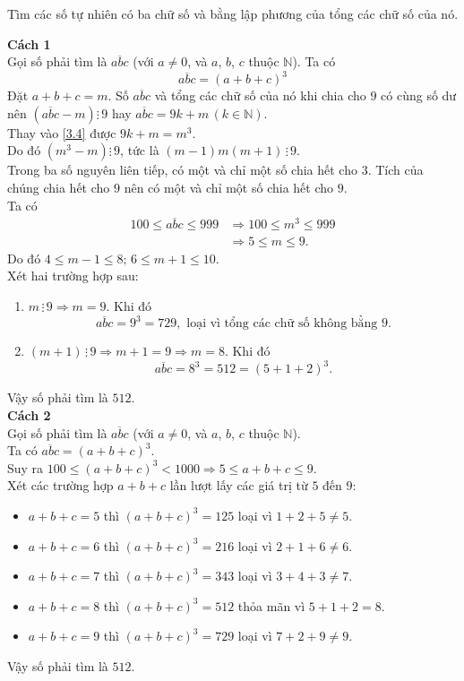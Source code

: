 \begin{bt}
 Tìm các số tự nhiên có ba chữ số và bằng lập phương của tổng các chữ số của nó.
 \loigiai
  {
  \textbf{Cách 1}\\
  Gọi số phải tìm là $\overline{abc}$ (với $a \neq 0$, và $a$, $b$, $c$ thuộc $\mathbb{N}$). Ta có
  \begin{equation}
   \overline{abc} = (a + b + c)^3 \label{3.4}
  \end{equation}
  Đặt $a + b + c = m$. Số $\overline{abc}$ và tổng các chữ số của nó khi chia cho $9$ có cùng số dư nên $\left( \overline{abc} - m \right) \vdots \, 9$ hay $\overline{abc} = 9k + m \, (k \in \mathbb{N})$.\\
  Thay vào \eqref{3.4} được $9k + m = m^3$.\\
  Do đó $\left( m^3 - m \right) \vdots \, 9$, tức là $(m - 1)m(m + 1) \, \vdots \, 9$.\\
  Trong ba số nguyên liên tiếp, có một và chỉ một số chia hết cho $3$. Tích của chúng chia hết cho $9$ nên có một và chỉ một số chia hết cho $9$.\\
  Ta có
  \begin{align*}
   100 \leq \overline{abc} \leq 999 & \Rightarrow 100 \leq m^3 \leq 999 \\
   & \Rightarrow 5 \leq m \leq 9.
  \end{align*}
  Do đó $4 \leq m - 1 \leq 8; \, 6 \leq m + 1 \leq 10$.\\
  Xét hai trường hợp sau:
  \begin{enumerate}
   \item $m \, \vdots \, 9 \Rightarrow m = 9$. Khi đó
   $$\overline{abc} = 9^3 = 729,  \textrm{ loại vì tổng các chữ số không bằng } 9.$$
   \item $(m + 1) \, \vdots \, 9 \Rightarrow m + 1 = 9 \Rightarrow m = 8$. Khi đó
   $$\overline{abc} = 8^3 = 512 = (5 + 1 + 2)^3.$$
  \end{enumerate}
  Vậy số phải tìm là $512$.\\
  \textbf{Cách 2}\\
  Gọi số phải tìm là $\overline{abc}$ (với $a \neq 0$, và $a$, $b$, $c$ thuộc $\mathbb{N}$).\\
  Ta có $\overline{abc} = (a + b + c)^3$.\\
  Suy ra $100 \leq (a + b + c)^3 < 1000 \Rightarrow 5 \leq a + b + c \leq 9$.\\
  Xét các trường hợp $a + b + c$ lần lượt lấy các giá trị từ $5$ đến $9$:
  \begin{itemize}
   \item $a + b + c = 5$ thì $(a + b + c)^3 = 125$ loại vì $1 + 2 + 5 \neq 5$.
   \item $a + b + c = 6$ thì $(a + b + c)^3 = 216$ loại vì $2 + 1 + 6 \neq 6$.
   \item $a + b + c = 7$ thì $(a + b + c)^3 = 343$ loại vì $3 + 4 + 3 \neq 7$.
   \item $a + b + c = 8$ thì $(a + b + c)^3 = 512$ thỏa mãn vì $5 + 1 + 2 = 8$.
   \item $a + b + c = 9$ thì $(a + b + c)^3 = 729$ loại vì $7 + 2 + 9 \neq 9$.
  \end{itemize}
  Vậy số phải tìm là $512$.
  }
\end{bt}


